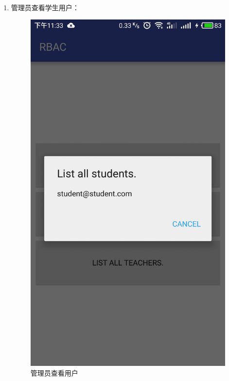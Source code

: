 \begin{itemize}
\begin{enumerate}
\begin{itemize}
\begin{enumerate}
				\item 管理员查看学生用户：
				\begin{figure}[H]
					\centering
					\includegraphics[height=0.39\textheight]{snapshot/17}
					\caption{管理员查看用户}
					\label{fig:17}
				\end{figure}
			

\end{enumerate}
\end{itemize}
\end{enumerate}
\end{itemize}
